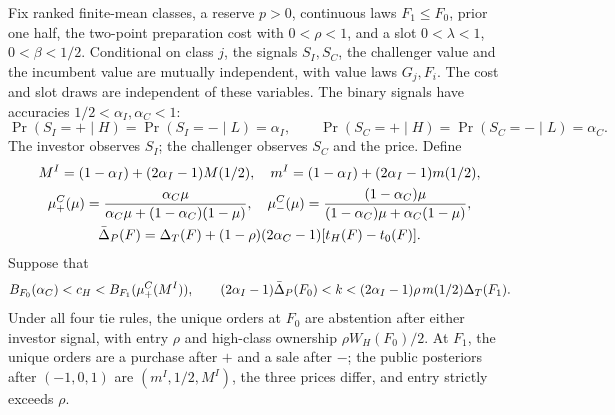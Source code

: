 \renewcommand{\theproposition}{A.\arabic{proposition}}
\renewcommand{\theHproposition}{A.\arabic{proposition}}
\setcounter{proposition}{5}
\begin{proposition}\label{prop:signals}
Fix ranked finite-mean classes, a reserve \(p>0\), continuous laws \(F_1\le F_0\), prior one half, the
two-point preparation cost with \(0<\rho<1\), and a slot \(0<\lambda<1\), \(0<\beta<1/2\). Conditional on class
\(j\), the signals \(S_I,S_C\), the challenger value and the incumbent value are mutually independent, with
value laws \(G_j,F_i\). The cost and slot draws are independent of these variables. The binary signals have
accuracies \(1/2<\alpha_I,\alpha_C<1\):
\[
\Pr(S_I=+\mid H)=\Pr(S_I=-\mid L)=\alpha_I,\qquad
\Pr(S_C=+\mid H)=\Pr(S_C=-\mid L)=\alpha_C.
\]
The investor observes \(S_I\); the challenger observes \(S_C\) and the price. Define
\[
\begin{gathered}
M^I=(1-\alpha_I)+(2\alpha_I-1)M(1/2),\quad
m^I=(1-\alpha_I)+(2\alpha_I-1)m(1/2),\\
\mu^C_+(\mu)=\frac{\alpha_C\mu}{\alpha_C\mu+(1-\alpha_C)(1-\mu)},\quad
\mu^C_-(\mu)=\frac{(1-\alpha_C)\mu}{(1-\alpha_C)\mu+\alpha_C(1-\mu)},\\
\bar\Delta_P(F)=\Delta_T(F)+(1-\rho)(2\alpha_C-1)[t_H(F)-t_0(F)].
\end{gathered}
\]
Suppose that
\[
B_{F_0}(\alpha_C)<c_H<B_{F_1}(\mu^C_+(M^I)),\qquad
(2\alpha_I-1)\bar\Delta_P(F_0)<k<(2\alpha_I-1)\rho\,m(1/2)\Delta_T(F_1).
\]
Under all four tie rules, the unique orders at \(F_0\) are abstention after either investor signal, with entry
\(\rho\) and high-class ownership \(\rho W_H(F_0)/2\). At \(F_1\), the unique orders are a purchase after \(+\)
and a sale after \(-\); the public posteriors after \((-1,0,1)\) are \((m^I,1/2,M^I)\), the three prices differ,
and entry strictly exceeds \(\rho\).


\end{proposition}
